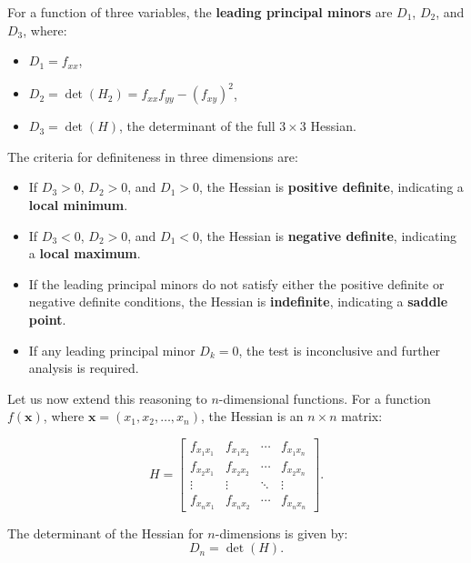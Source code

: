 \noindent For a function of three variables, the \textbf{leading principal minors}   are \( D_1 \), \( D_2 \), and \( D_3 \), where:
\begin{itemize}
    \item \( D_1 = f_{xx} \),
    \item \( D_2 = \det(H_2) = f_{xx}f_{yy} - (f_{xy})^2 \),
    \item \( D_3 = \det(H) \), the determinant of the full \( 3 \times 3 \) Hessian.
\end{itemize}

\noindent The criteria for definiteness in three dimensions are:
\begin{itemize}
    \item If \( D_3 > 0 \), \( D_2 > 0 \), and \( D_1 > 0 \), the Hessian is \textbf{positive definite}, indicating a \textbf{local minimum}.
    \item If \( D_3 < 0 \), \( D_2 > 0 \), and \( D_1 < 0 \), the Hessian is \textbf{negative definite}, indicating a \textbf{local maximum}.
    \item If the leading principal minors do not satisfy either the positive definite or negative definite conditions, the Hessian is \textbf{indefinite}, indicating a \textbf{saddle point}.
    \item If any leading principal minor \( D_k = 0 \), the test is inconclusive and further analysis is required.
\end{itemize}

\noindent Let us now extend this reasoning to \( n \)-dimensional functions. For a function \( f(\mathbf{x}) \), where \( \mathbf{x} = (x_1, x_2, \dots, x_n) \), the Hessian is an \( n \times n \) matrix:

\[
H = \begin{bmatrix}
f_{x_1x_1} & f_{x_1x_2} & \cdots & f_{x_1x_n} \\[5pt]
f_{x_2x_1} & f_{x_2x_2} & \cdots & f_{x_2x_n} \\[5pt]
\vdots & \vdots & \ddots & \vdots \\[5pt]
f_{x_nx_1} & f_{x_nx_2} & \cdots & f_{x_nx_n}
\end{bmatrix}.
\]

\noindent The determinant of the Hessian for \( n \)-dimensions is given by:
\[
D_n = \det(H).
\]

